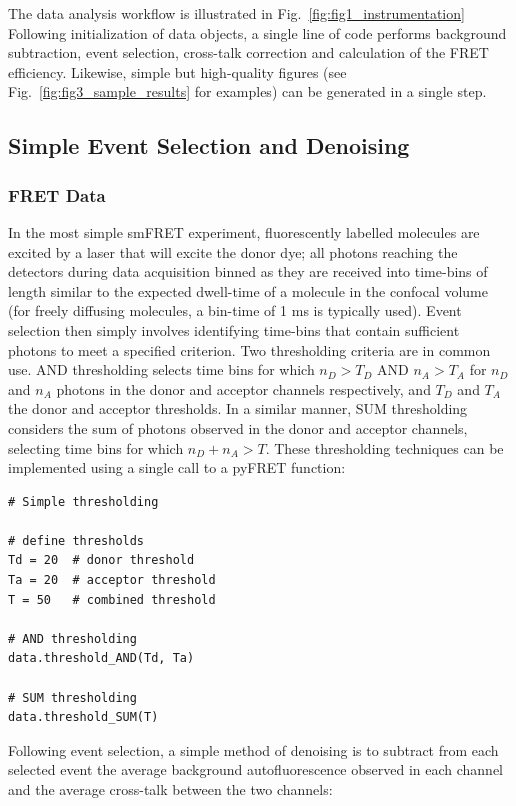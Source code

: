 The data analysis workflow is illustrated in Fig.~\ref{fig:fig1_instrumentation} Following initialization of data objects, a single line of code performs background subtraction, event selection, cross-talk correction and calculation of the FRET efficiency. Likewise, simple but high-quality figures (see Fig.~\ref{fig:fig3_sample_results} for examples) can be generated in a single step.

\subsection*{Simple Event Selection and Denoising}
\subsubsection*{FRET Data}
In the most simple smFRET experiment, fluorescently labelled molecules are excited by a laser that will excite the donor dye; all photons reaching the detectors during data acquisition binned as they are received into time-bins of length similar to the expected dwell-time of a molecule in the confocal volume (for freely diffusing molecules, a bin-time of 1 ms is typically used). Event selection then simply involves identifying time-bins that contain sufficient photons to meet a specified criterion. Two thresholding criteria are in common use. AND thresholding selects time bins for which $n_D > T_D$ AND $n_A > T_A$ for $n_D$ and $n_A$ photons in the donor and acceptor channels respectively, and $T_D$ and $T_A$ the donor and acceptor thresholds. In a similar manner, SUM thresholding considers the sum of photons observed in the donor and acceptor channels, selecting time bins for which $n_D + n_A > T$. These thresholding techniques can be implemented using a single call to a pyFRET function: 

\begin{lstlisting}
# Simple thresholding

# define thresholds
Td = 20  # donor threshold
Ta = 20  # acceptor threshold
T = 50   # combined threshold

# AND thresholding
data.threshold_AND(Td, Ta)

# SUM thresholding
data.threshold_SUM(T)
\end{lstlisting}

Following event selection, a simple method of denoising is to subtract from each selected event the average background autofluorescence observed in each channel and the average cross-talk between the two channels:

